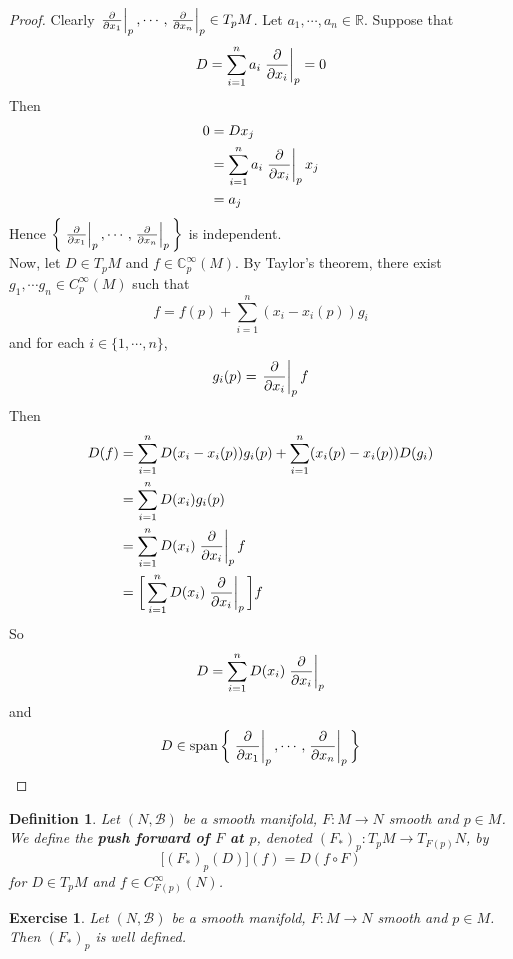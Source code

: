 \documentclass[12pt]{amsart}
\newtheorem{defn}[thm]{Definition}
\newtheorem{ex}[thm]{Exercise}
\newcommand{\C}{\mathbb{C}}
\newcommand{\R}{\mathbb{R}}
\newcommand{\MB}{\mathcal{B}}
\DeclareMathOperator{\spn}{span}
\begin{document}
	\begin{proof}
		Clearly $\eval{\pdv{x_1}}_{p}, \cdots, \eval{\pdv{x_n}}_{p} \in T_pM$. Let $a_1, \cdots, a_n \in \R$. Suppose that $$D = \sum_{i=1}^n a_i \eval{\pdv{x_i}}_{p} = 0$$
		Then 
		\begin{align*}
			0
			&= D x_j \\
			&= \sum_{i=1}^n a_i \eval{\pdv{x_i}}_{p} x_j \\
			&= a_j
		\end{align*}
		Hence $\bigg \{\eval{\pdv{x_1}}_{p}, \cdots, \eval{\pdv{x_n}}_{p} \bigg \}$ is independent.\\
		Now, let $D \in T_pM$ and $f \in \C^{\infty}_p(M)$. By Taylor's theorem, there exist $g_1, \cdots g_n \in C_p^{\infty}(M)$ such that $$f = f(p) + \sum_{i=1}^n(x_i - x_i(p)) g_i$$ and for each $i \in \{1, \cdots, n\}$, $$g_i(p) = \eval{\pdv{x_i}}_{p} f $$ Then 
		\begin{align*}
			D(f)
			&= \sum_{i=1}^nD(x_i - x_i(p)) g_i(p) + \sum_{i=1}^n(x_i(p) - x_i(p)) D(g_i) \\
			&= \sum_{i=1}^nD(x_i)g_i(p) \\
			&= \sum_{i=1}^nD(x_i)\eval{\pdv{x_i}}_{p} f \\
			&= \bigg[ \sum_{i=1}^nD(x_i)\eval{\pdv{x_i}}_{p} \bigg] f
		\end{align*}
		So $$D = \sum_{i=1}^nD(x_i)\eval{\pdv{x_i}}_{p} $$ and $$D \in \spn \bigg \{\eval{\pdv{x_1}}_{p}, \cdots, \eval{\pdv{x_n}}_{p} \bigg \}$$
	\end{proof}



	\begin{defn}
		Let $(N, \MB)$ be a smooth manifold, $F: M \rightarrow N$ smooth and $p \in M$. We define the \textbf{push forward of $F$ at $p$}, denoted $(F_*)_p: T_pM \rightarrow T_{F(p)}N$, by $$\bigg[ (F_*)_p(D) \bigg] (f) = D (f \circ F)$$  for $D \in T_pM$ and $f \in C^{\infty}_{F(p)}(N)$.
	\end{defn}
	
	\begin{ex}
	Let $(N, \MB)$ be a smooth manifold, $F: M \rightarrow N$ smooth and $p \in M$. Then $(F_*)_p$ is well defined.
	\end{ex}
	
\end{document}
